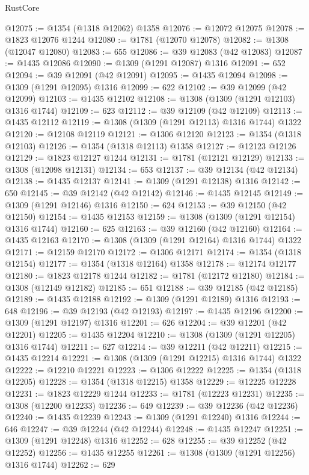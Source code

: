 \begin{lexlean}{RustCore}
\begin{coremodule}
@12075 := @1354 (@1318 @12062) @1358
@12076 := @12072 @12075
@12078 := @1823 @12076 @1244
@12080 := @1781 (@12070 @12078)
@12082 := @1308 (@12047 @12080)
@12083 := 655
@12086 := @39 @12083 (@42 @12083)
@12087 := @1435 @12086
@12090 := @1309 (@1291 @12087) @1316
@12091 := 652
@12094 := @39 @12091 (@42 @12091)
@12095 := @1435 @12094
@12098 := @1309 (@1291 @12095) @1316
@12099 := 622
@12102 := @39 @12099 (@42 @12099)
@12103 := @1435 @12102
@12108 := @1308 (@1309 (@1291 @12103) @1316 @1744)
@12109 := 623
@12112 := @39 @12109 (@42 @12109)
@12113 := @1435 @12112
@12119 := @1308 (@1309 (@1291 @12113) @1316 @1744) @1322
@12120 := @12108 @12119
@12121 := @1306 @12120
@12123 := @1354 (@1318 @12103)
@12126 := @1354 (@1318 @12113) @1358
@12127 := @12123 @12126
@12129 := @1823 @12127 @1244
@12131 := @1781 (@12121 @12129)
@12133 := @1308 (@12098 @12131)
@12134 := 653
@12137 := @39 @12134 (@42 @12134)
@12138 := @1435 @12137
@12141 := @1309 (@1291 @12138) @1316
@12142 := 650
@12145 := @39 @12142 (@42 @12142)
@12146 := @1435 @12145
@12149 := @1309 (@1291 @12146) @1316
@12150 := 624
@12153 := @39 @12150 (@42 @12150)
@12154 := @1435 @12153
@12159 := @1308 (@1309 (@1291 @12154) @1316 @1744)
@12160 := 625
@12163 := @39 @12160 (@42 @12160)
@12164 := @1435 @12163
@12170 := @1308 (@1309 (@1291 @12164) @1316 @1744) @1322
@12171 := @12159 @12170
@12172 := @1306 @12171
@12174 := @1354 (@1318 @12154)
@12177 := @1354 (@1318 @12164) @1358
@12178 := @12174 @12177
@12180 := @1823 @12178 @1244
@12182 := @1781 (@12172 @12180)
@12184 := @1308 (@12149 @12182)
@12185 := 651
@12188 := @39 @12185 (@42 @12185)
@12189 := @1435 @12188
@12192 := @1309 (@1291 @12189) @1316
@12193 := 648
@12196 := @39 @12193 (@42 @12193)
@12197 := @1435 @12196
@12200 := @1309 (@1291 @12197) @1316
@12201 := 626
@12204 := @39 @12201 (@42 @12201)
@12205 := @1435 @12204
@12210 := @1308 (@1309 (@1291 @12205) @1316 @1744)
@12211 := 627
@12214 := @39 @12211 (@42 @12211)
@12215 := @1435 @12214
@12221 := @1308 (@1309 (@1291 @12215) @1316 @1744) @1322
@12222 := @12210 @12221
@12223 := @1306 @12222
@12225 := @1354 (@1318 @12205)
@12228 := @1354 (@1318 @12215) @1358
@12229 := @12225 @12228
@12231 := @1823 @12229 @1244
@12233 := @1781 (@12223 @12231)
@12235 := @1308 (@12200 @12233)
@12236 := 649
@12239 := @39 @12236 (@42 @12236)
@12240 := @1435 @12239
@12243 := @1309 (@1291 @12240) @1316
@12244 := 646
@12247 := @39 @12244 (@42 @12244)
@12248 := @1435 @12247
@12251 := @1309 (@1291 @12248) @1316
@12252 := 628
@12255 := @39 @12252 (@42 @12252)
@12256 := @1435 @12255
@12261 := @1308 (@1309 (@1291 @12256) @1316 @1744)
@12262 := 629

\end{coremodule}
\end{lexlean}
